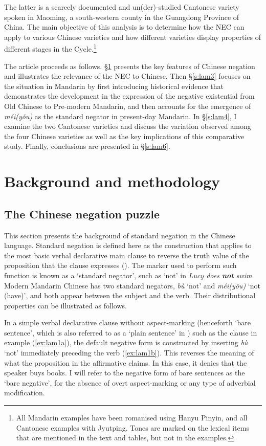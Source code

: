 \documentclass[output=paper]{langscibook}
\begin{document}
The latter is a scarcely documented and un(der)-studied Cantonese variety spoken in Maoming, a south-western county in the Guangdong Province of China. The main objective of this analysis is to determine how the NEC can apply to various Chinese varieties and how different varieties display properties of different stages in the Cycle.\footnote{All Mandarin examples have been romanised using Hanyu Pinyin, and all Cantonese examples with Jyutping. Tones are marked on the lexical items that are mentioned in the text and tables, but not in the examples.} 

The article proceeds as follows. §\ref{s:lam2} presents the key features of Chinese negation and illustrates the relevance of the NEC to Chinese. Then §\ref{s:lam3} focuses on the situation in Mandarin by first introducing historical evidence that demonstrates the development in the expression of the negative existential from Old Chinese to Pre-modern Mandarin, and then accounts for the emergence of \textit{méi(yǒu)} as the standard negator in present-day Mandarin. In §\ref{s:lam4}, I examine the two Cantonese varieties and discuss the variation observed among the four Chinese varieties as well as the key implications of this comparative study. Finally, conclusions are presented in §\ref{s:lam6}. %

\section{Background and methodology}\label{s:lam2}
\subsection{The Chinese negation puzzle}\label{s:lam2-1}

This section presents the background of standard negation in the Chinese language. Standard negation is defined here as the construction that applies to the most basic verbal declarative main clause to reverse the truth value of the proposition that the clause expresses (\citealt{Miestamo2005}). The marker used to perform such function is known as a `standard negator', such as `not' in \textit{Lucy does \textbf{not} swim}. Modern Mandarin Chinese has two standard negators, \textit{bù} `not' and \textit{méi(yǒu)} `not (have)', and both appear between the subject and the verb. Their distributional properties can be illustrated as follows. 

In a simple verbal declarative clause without aspect-marking (henceforth `bare sentence', which is also referred to as a `plain sentence' in \citealt{Wang1965}) such as the clause in example (\ref{ex:lam1a}), the default negative form is constructed by inserting \textit{bù} `not' immediately preceding the verb (\ref{ex:lam1b}). This reverses the meaning of what the proposition in the affirmative claims. In this case, it denies that the speaker buys books. I will refer to the negative form of bare sentences as the `bare negative', for the absence of overt aspect-marking or any type of adverbial modification.
\end{document}
